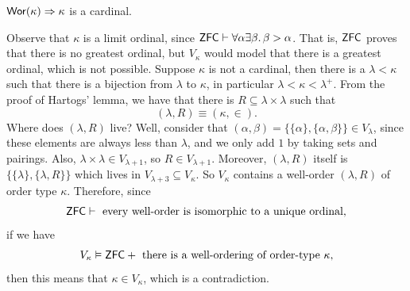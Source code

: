 \documentclass{article}
\begin{document}
\begin{fancythm}{}
    $\mathsf{Wor}(\kappa) \Rightarrow \kappa$ is a cardinal.
\end{fancythm}
\proof Observe that $\kappa$ is a limit ordinal, since $\mathsf{ZFC} \vdash \forall \alpha \exists \beta.\, \beta > \alpha$. That is, $\mathsf{ZFC}$ proves that there is no greatest ordinal, but $V_{\kappa}$ would model that there is a greatest ordinal, which is not possible.\gap 
Suppose $\kappa$ is not a cardinal, then there is a $\lambda < \kappa$ such that there is a bijection from $\lambda$ to $\kappa$, in particular $\lambda < \kappa < \lambda^{+}$. From the proof of Hartogs' lemma, we have that there is $R \subseteq \lambda \times \lambda$ such that \[ (\lambda, R) \equiv (\kappa, \in).\] Where does $(\lambda, R)$ live? Well, consider that $(\alpha, \beta) = \{\{\alpha\}, \{\alpha, \beta\}\} \in V_{\lambda}$, since these elements are always less than $\lambda$, and we only add $1$ by taking sets and pairings. Also, $\lambda \times \lambda \in V_{\lambda+1}$, so $R \in V_{\lambda + 1}$. Moreover, $(\lambda, R)$ itself is $\{\{\lambda\}, \{\lambda, R\}\}$ which lives in $V_{\lambda+3} \subseteq V_{\kappa}$. So $V_{\kappa}$ contains a well-order $(\lambda, R)$ of order type $\kappa$. Therefore, since \[\mathsf{ZFC} \vdash \text{ every well-order is isomorphic to a unique ordinal,}\]
if we have \[V_{\kappa} \vDash \mathsf{ZFC} + \text{ there is a well-ordering of order-type $\kappa$},\] then this means that $\kappa \in V_{\kappa}$, which is a contradiction. \endproof
\end{document}
